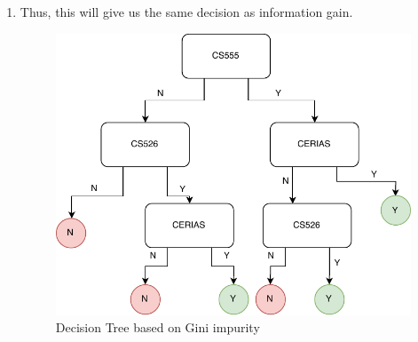 \documentclass{article}
\begin{document}
\begin{enumerate}
\begin{enumerate}
        \item Thus, this will give us the same decision as information gain. 
        \begin{figure}[h!]
        \centering
        \includegraphics[scale=.75]{Information-gain.pdf}
        \caption{Decision Tree based on Gini impurity}
        \end{figure}
    \end{enumerate}
\end{enumerate}
\end{document}

